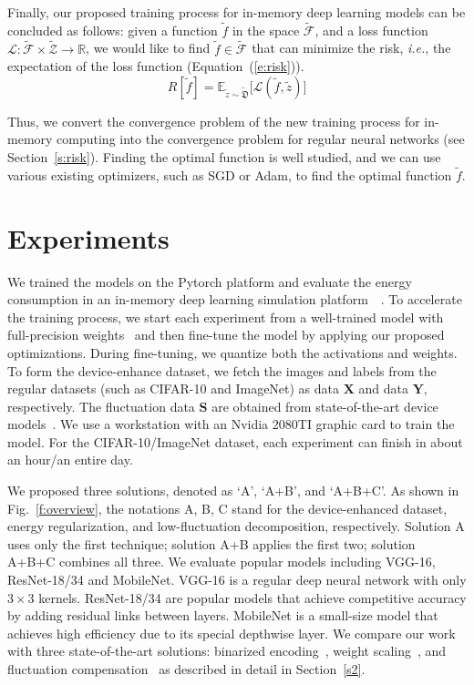 \documentclass[10pt,journal,compsoc]{IEEEtran}
\begin{document}
Finally, our proposed training process for in-memory deep learning models can be concluded as follows: given a function $\widetilde{f}$ in the space $\widetilde{\mathcal{F}}$, and a loss function $\mathcal{L}:\widetilde{\mathcal{F}} \times \widetilde{\mathcal{Z}}\rightarrow \mathbb{R}$, we would like to find $\widetilde{f}\in \widetilde{\mathcal{F}}$ that can minimize the risk, \textit{i.e.}, the expectation of the loss function (Equation~(\ref{e:risk})).
\begin{equation}
R[\widetilde{f}]=\mathbb{E}_{\widetilde{z}\sim \widetilde{\mathfrak{D}}}\big[\mathcal{L}(\widetilde{f},\widetilde{z})\big]
\label{e:risk}
\end{equation}

Thus, we convert the convergence problem of the new training process for in-memory computing into the convergence problem for regular neural networks (see Section~\ref{s:risk}). Finding the optimal function is well studied, and we can use various existing optimizers, such as SGD or Adam, to find the optimal function $\widetilde{f}$.



\section{Experiments}
\label{s5}

We trained the models on the Pytorch platform and evaluate the energy consumption in an in-memory deep learning simulation platform~\cite{lee2019system}~\cite{wang2020ncpower}. To accelerate the training process, we start each experiment from a well-trained model with full-precision weights~\cite{pytorchzoo} and then fine-tune the model by applying our proposed optimizations. During fine-tuning, we quantize both the activations and weights. To form the device-enhance dataset, we fetch the images and labels from the regular datasets (such as CIFAR-10 and ImageNet) as data $\textbf{X}$ and data $\textbf{Y}$, respectively. The fluctuation data $\textbf{S}$ are obtained from state-of-the-art device models~\cite{ielmini2010resistance}. We use a workstation with an Nvidia 2080TI graphic card to train the model. For the CIFAR-10/ImageNet dataset, each experiment can finish in about an hour/an entire day.

We proposed three solutions, denoted as `A',  `A+B', and `A+B+C'. As shown in Fig.~\ref{f:overview}, the notations A, B, C stand for the device-enhanced dataset, energy regularization, and low-fluctuation decomposition, respectively. Solution A uses only the first technique; solution A+B applies the first two; solution A+B+C combines all three. We evaluate popular models including VGG-16, ResNet-18/34 and MobileNet. VGG-16 is a regular deep neural network with only $3\times 3$ kernels. ResNet-18/34 are popular models that achieve competitive accuracy by adding residual links between layers. MobileNet is a small-size model that achieves high efficiency due to its special depthwise layer. We compare our work with three state-of-the-art solutions: binarized encoding~\cite{zhu2019configurable}, weight scaling~\cite{ielmini2010resistance}, and fluctuation compensation~\cite{wan2020voltage} as described in detail in Section~\ref{s2}.
\end{document}
